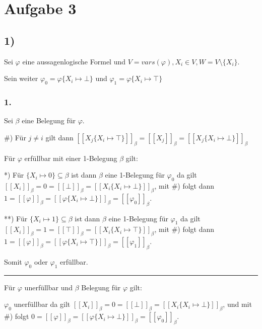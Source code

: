 \section*{Aufgabe 3}

\subsection*{1)}

Sei $\varphi$ eine aussagenlogische Formel und $V = vars(\varphi),X_i \in V, W = V \setminus \{X_i\}$.

Sein weiter $\varphi_0 = \varphi\{X_i \mapsto \bot\}$ 
und $\varphi_1 = \varphi\{X_i \mapsto \top\}$ 

\subsubsection*{1.}
Sei $\beta$ eine Belegung für $\varphi$.

\#) Für $j \neq i$ gilt dann $[\![X_j\{X_i \mapsto \top\}]\!]_\beta = [\![X_j]\!]_\beta = [\![X_j\{X_i \mapsto \bot\}]\!]_\beta$%

\hfill

Für $\varphi$ erfüllbar mit einer 1-Belegung $\beta$ gilt:

*) Für $\{X_i \mapsto 0\} \subseteq \beta$ ist dann $\beta$  eine 1-Belegung für 
$\varphi_0$ da gilt $[\![X_i]\!]_\beta = 0 = [\![\bot]\!]_\beta = [\![X_i\{X_i \mapsto \bot\}]\!]_\beta$, 
mit \#) folgt dann $1 
= [\![\varphi]\!]_\beta 
= [\![\varphi\{X_i \mapsto \bot\}]\!]_\beta 
= [\![\varphi_0]\!]_\beta$.

\hfill

**) Für $\{X_i \mapsto 1\} \subseteq \beta$ ist dann $\beta$  eine 1-Belegung für 
$\varphi_1$ da gilt $[\![X_i]\!]_\beta = 1 = [\![\top]\!]_\beta = [\![X_i\{X_i \mapsto \top\}]\!]_\beta$,
mit \#) folgt dann $1 
= [\![\varphi]\!]_\beta 
= [\![\varphi\{X_i \mapsto \top\}]\!]_\beta 
= [\![\varphi_1]\!]_\beta$.

\hfill

Somit $\varphi_0$ oder $\varphi_1$ erfüllbar.

\hfill

\hrule

\hfill

Für $\varphi$ unerfüllbar und $\beta$ Belegung für $\varphi$ gilt:

$\varphi_0$ unerfüllbar da gilt $[\![X_i]\!]_\beta = 0 = [\![\bot]\!]_\beta = [\![X_i\{X_i \mapsto \bot\}]\!]_\beta$, und mit \#) folgt $0 = [\![\varphi]\!]_\beta = [\![\varphi\{X_i \mapsto \bot\}]\!]_\beta = [\![\varphi_0]\!]_\beta$.

